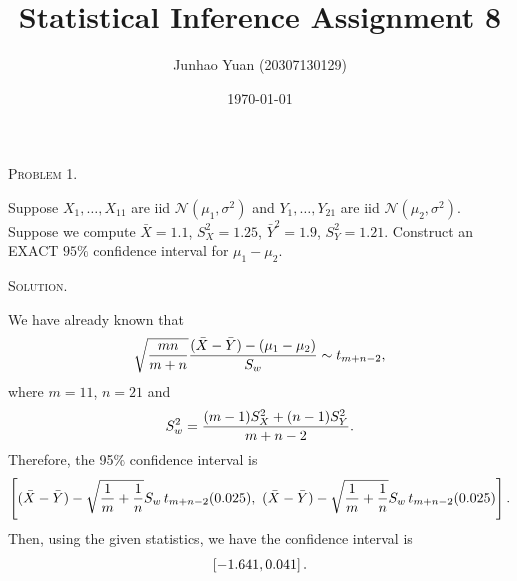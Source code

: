 \documentclass{article}
\title{\textbf{Statistical Inference Assignment 8}}
\author{Junhao Yuan (20307130129)}
\date{\today}
\begin{document}
\begin{CJK}{UTF8}{gbsn}

    \maketitle
    \def \RR{{\mathbb R}}
    \def \EE{{\mathbb E}}
    \def \VV{{\mathbb V}}
    \def \II{{\mathbb I}}
    \def \NN{{\mathcal N}}


    \begin{shaded}
        \noindent\textsc{Problem 1.}\par
        Suppose $X_1, \ldots, X_{11}$ are iid $\NN(\mu_1, \sigma^2)$ and $Y_1, \ldots, Y_{21}$ are iid
        $\NN(\mu_2, \sigma^2)$. Suppose we compute $\bar{X}=1.1$, $S_X^2=1.25$, $\bar{Y}^2=1.9$, $S_Y^2=1.21$. Construct
        an EXACT $95\%$ confidence interval for $\mu_1-\mu_2$.
    \end{shaded}
    \noindent\textsc{Solution.}\par
    We have already known that
    \begin{align}
        \sqrt{\frac{mn}{m + n}} \frac{(\bar{X} - \bar{Y}) - (\mu_1 - \mu_2)}{S_{w}} \sim t_{m+n-2},\notag
    \end{align}
    where $m=11$, $n=21$ and
    \begin{align}
        S_w^2 = \frac{(m-1)S_X^2 + (n-1)S_Y^2}{m+n-2}.\notag
    \end{align}
    Therefore, the 95$\%$ confidence interval is
    \begin{align}
        \left [ (\bar{X} - \bar{Y}) - \sqrt{\frac{1}{m} + \frac{1}{n}} S_w \,t_{m+n-2}(0.025), \,\,  (\bar{X} - \bar{Y}) - \sqrt{\frac{1}{m}+ \frac{1}{n}} S_w \,t_{m+n-2}(0.025)\right ].\notag
    \end{align}
    Then, using the given statistics, we have the confidence interval is
    \begin{align}
        \left [  -1.641, 0.041 \right ].\notag
    \end{align}







\end{CJK}
\end{document}
